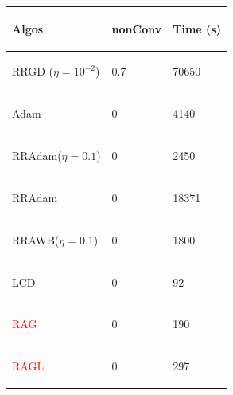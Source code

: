 \begin{table}[h!]
	\begin{tabular}{lll}
		\toprule
		\begin{bf} Algos \end{bf} & \begin{bf} nonConv\end{bf} & \begin{bf} Time (s) \end{bf} \\ \midrule
		\begin{bf}RRGD ($\eta=10^{-2}$)\end{bf} & 0.7 & 70650 \\ \midrule
		\begin{bf}Adam\end{bf} & 0 & 4140 \\ 
		\midrule
		\begin{bf}RRAdam($\eta=0.1$)\end{bf} & 0 & 2450 \\ \midrule
		\begin{bf}RRAdam\end{bf} & 0 & 18371 \\ \midrule
		\begin{bf}RRAWB($\eta=0.1$)\end{bf} &  0 & 1800 \\ \midrule
		\begin{bf}LCD\end{bf} & 0 & 92 \\ \midrule
		\begin{bf}\textcolor{red}{RAG}\end{bf} & 0 & 190 \\ \midrule
		\begin{bf}\textcolor{red}{RAGL}\end{bf} &  0 & 297 \\ \bottomrule
	\end{tabular}
	
	\vspace{0.2cm}
	

\end{table}
